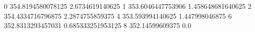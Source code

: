 0 354.8194580078125 2.6734619140625
1 353.6046447753906 1.458648681640625
2 354.4334716796875 2.2874755859375
4 353.593994140625 1.447998046875
6 352.8313293457031 0.685333251953125
8 352.14599609375 0.0
